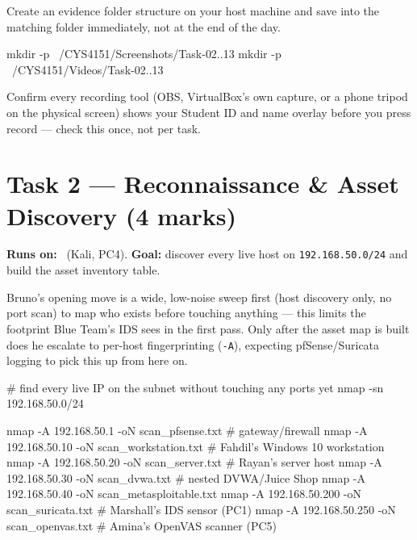 \documentclass[11pt,a4paper]{article}
\begin{document}
\begin{steps}
\item Create an evidence folder structure on your host machine and save into the
  matching folder immediately, not at the end of the day.
\end{steps}

\begin{cmdbox}
\begin{cmdverb}
mkdir -p ~/CYS4151/Screenshots/Task-{02..13}
mkdir -p ~/CYS4151/Videos/Task-{02..13}
\end{cmdverb}
\end{cmdbox}

\begin{notebox}
Confirm every recording tool (OBS, VirtualBox's own capture, or a phone tripod on the
physical screen) shows your Student ID and name overlay before you press record ---
check this once, not per task.
\end{notebox}

\clearpage

\section{Task 2 --- Reconnaissance \& Asset Discovery (4 marks)}
\textbf{Runs on:} \bruno\ (Kali, PC4). \quad\textbf{Goal:} discover every live host on
\texttt{192.168.50.0/24} and build the asset inventory table.

\begin{redbox}
Bruno's opening move is a wide, low-noise sweep first (host discovery only, no port
scan) to map who exists before touching anything --- this limits the footprint Blue
Team's IDS sees in the first pass. Only after the asset map is built does he escalate
to per-host fingerprinting (\texttt{-A}), expecting pfSense/Suricata logging to pick
this up from here on.
\end{redbox}

\begin{cmdbox}
\begin{cmdverb}
# find every live IP on the subnet without touching any ports yet
nmap -sn 192.168.50.0/24
\end{cmdverb}
\end{cmdbox}

\begin{cmdbox}
\begin{cmdverb}
nmap -A 192.168.50.1   -oN scan_pfsense.txt       # gateway/firewall
nmap -A 192.168.50.10  -oN scan_workstation.txt   # Fahdil's Windows 10 workstation
nmap -A 192.168.50.20  -oN scan_server.txt        # Rayan's server host
nmap -A 192.168.50.30  -oN scan_dvwa.txt          # nested DVWA/Juice Shop
nmap -A 192.168.50.40  -oN scan_metasploitable.txt
nmap -A 192.168.50.200 -oN scan_suricata.txt      # Marshall's IDS sensor (PC1)
nmap -A 192.168.50.250 -oN scan_openvas.txt       # Amina's OpenVAS scanner (PC5)
\end{cmdverb}
\end{cmdbox}
\end{document}
